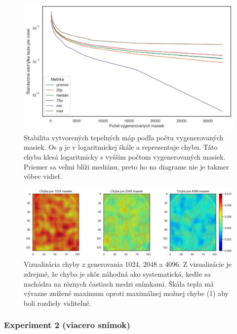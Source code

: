 \begin{figure}[h!]
    \centering
    \includegraphics[width=14cm]{assets/images/risei_stability_1.png}
    \caption{Stabilita vytvorených tepelných máp podľa počtu vygenerovaných masiek. Os $y$ je v logaritmickej škále a reprezentuje chybu. Táto chyba klesá logaritmicky s vyšším počtom vygenerovaných masiek. Priemer sa veľmi blíži mediánu, preto ho na diagrame nie je takmer vôbec vidieť.}
    \label{fig:risei_stability_1}
\end{figure}

\begin{figure}[h!]
    \centering
    \includegraphics[width=14cm]{assets/images/risei_stability_error_visialisation.png}
    \caption{Vizualizácia chyby z generovania 1024, 2048 a 4096. Z vizualizácie je zdrejmé, že chyba je skôr náhodná ako systematická, keďže sa nachádza na rôznych častiach medzi snímkami. Škála tepla má výrazne znížené maximum oproti maximálnej možnej chybe (1) aby boli rozdiely viditeľné.}
    \label{fig:risei_stability_error_visialisation}
\end{figure}

\subsubsection{Experiment 2 (viacero snímok)}

